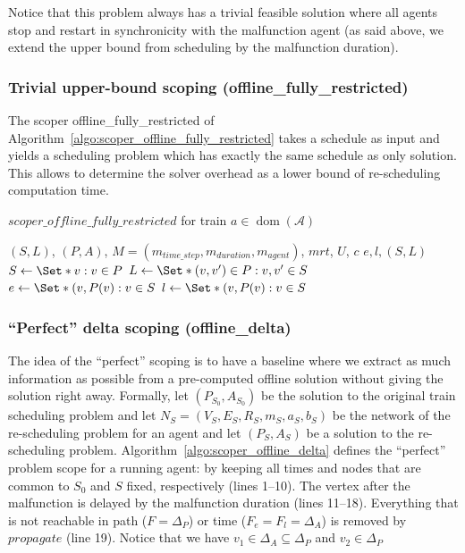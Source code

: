 \documentclass{article}
\DeclareMathOperator{\dom}{dom}
\begin{document}
Notice that this problem always has a trivial feasible solution where all agents stop and restart in synchronicity with the malfunction agent (as said above, we extend the upper bound from scheduling by the malfunction duration).


\subsubsection{Trivial upper-bound scoping (offline\_fully\_restricted)}
\label{subsubsec:scope_fully_restricted}

The scoper offline\_fully\_restricted of Algorithm~\ref{algo:scoper_offline_fully_restricted} takes a schedule as input and yields a scheduling problem which has exactly the same schedule as only solution. This allows to determine the solver overhead as a lower bound of re-scheduling computation time.



\begin{algorithm}
	\caption{$scoper\_offline\_fully\_restricted$ for  train $a \in \dom(\mathcal{A})$} \label{algo:scoper_offline_fully_restricted}
	\begin{algorithmic}[1]
		\Require $(S,L)$, $(P,A)$, $M=(m_{time\_step},m_{duration},m_{agent})$, $mrt$, $U$, $c$
	    \Ensure $e,l,(S,L)$
        \State $S \leftarrow \Set*{v: v\in P}$
        \State $L \leftarrow \Set*{(v,v^\prime) \in P: v,v^\prime \in S}$
        \State $e \leftarrow \Set*{(v,P(v): v\in S}$
        \State $l \leftarrow \Set*{(v,P(v): v\in S}$
	\end{algorithmic}
\end{algorithm}

\subsubsection{``Perfect'' delta scoping (offline\_delta)}
\label{subsubsec:scope_offline_delta}

The idea of the ``perfect'' scoping is to have a baseline where we extract as much information as possible from a pre-computed offline solution without giving the solution right away.
%
Formally, let $(P_{S_0},A_{S_0})$ be the solution to the original train scheduling problem
and let $N_S=(V_S,E_S,R_S,m_S,a_S,b_S)$ be the network of the re-scheduling problem for an agent
and  let $(P_S,A_S)$ be a solution to the re-scheduling problem. Algorithm~\ref{algo:scoper_offline_delta} defines the ``perfect'' problem scope for a running agent: by keeping all times and nodes that are common to $S_0$ and $S$ fixed, respectively (lines 1--10).
The vertex after the malfunction is delayed by the malfunction duration (lines 11--18).
Everything that is not reachable in path ($F=\Delta_P$) or time ($F_e=F_l=\Delta_A$) is removed by $propagate$ (line 19). Notice that we have $v_1 \in \Delta_A \subseteq \Delta_P$ and $v_2 \in \Delta_P$
\end{document}

